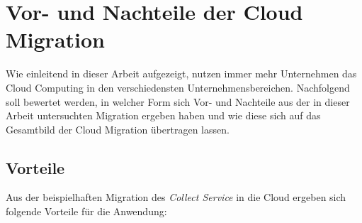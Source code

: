 


\pagebreak

\section{Vor- und Nachteile der Cloud Migration}
Wie einleitend in dieser Arbeit aufgezeigt, nutzen immer mehr Unternehmen das Cloud Computing in den verschiedensten Unternehmensbereichen. Nachfolgend soll bewertet werden, in welcher Form sich Vor- und Nachteile aus der in dieser Arbeit untersuchten Migration ergeben haben und wie diese sich auf das Gesamtbild der Cloud Migration übertragen lassen.

\subsection{Vorteile}
Aus der beispielhaften Migration des \textit{Collect Service} in die Cloud ergeben sich folgende Vorteile für die Anwendung:


